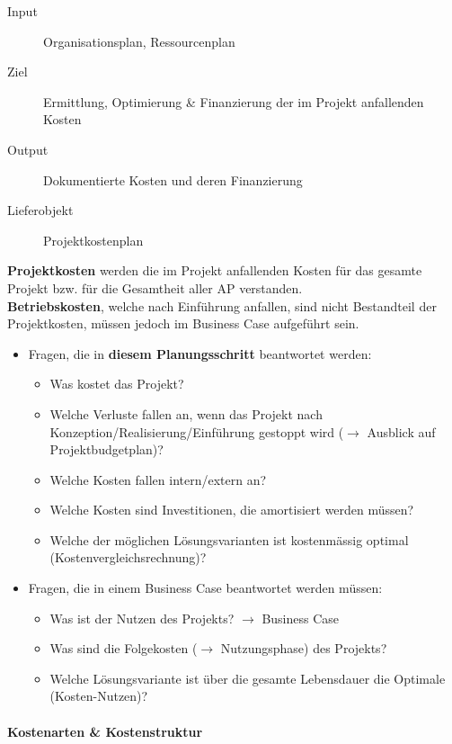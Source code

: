 \documentclass[a4paper]{article}
\begin{document}
		\begin{description}
			\item[Input] Organisationsplan, Ressourcenplan
			\item[Ziel] Ermittlung, Optimierung \& Finanzierung der im Projekt anfallenden Kosten
			\item[Output] Dokumentierte Kosten und deren Finanzierung
			\item[Lieferobjekt] Projektkostenplan
		\end{description}
		\vspace{1em}
		\textbf{Projektkosten} werden die im Projekt anfallenden Kosten für das gesamte Projekt bzw. für die Gesamtheit aller AP verstanden.\\
		\textbf{Betriebskosten}, welche nach Einführung anfallen, sind nicht Bestandteil der Projektkosten, müssen jedoch im Business Case aufgeführt sein.
		
		\begin{itemize}
			\item Fragen, die in \textbf{diesem Planungsschritt} beantwortet werden:
				\begin{itemize}
					\item Was kostet das Projekt?
					\item Welche Verluste fallen an, wenn das Projekt nach Konzeption/Realisierung/Einführung gestoppt wird ($\rightarrow$ Ausblick auf Projektbudgetplan)?
					\item Welche Kosten fallen intern/extern an?
					\item Welche Kosten sind Investitionen, die amortisiert werden müssen?
					\item Welche der möglichen Lösungsvarianten ist kostenmässig optimal (Kostenvergleichsrechnung)?
				\end{itemize}
			\item Fragen, die in einem Business Case beantwortet werden müssen:
				\begin{itemize}
					\item Was ist der Nutzen des Projekts? $\rightarrow$ Business Case
					\item Was sind die Folgekosten ($\rightarrow$ Nutzungsphase) des Projekts?
					\item Welche Lösungsvariante ist über die gesamte Lebensdauer die Optimale (Kosten-Nutzen)?
				\end{itemize}
		\end{itemize}
	
			\paragraph{Kostenarten \& Kostenstruktur}
			
\end{document}
